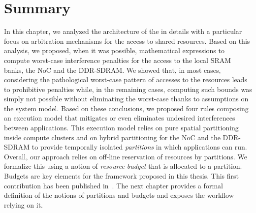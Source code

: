 \documentclass[main.tex]{subfiles}
\begin{document}
\section{Summary}
In this chapter, we analyzed the architecture of the \mppalong in details with
a particular focus on arbitration mechanisms for the access to shared
resources. Based on this analysis, we proposed, when it was possible,
mathematical expressions to compute worst-case interference penalties for the
access to the local SRAM banks, the NoC and the DDR-SDRAM. We showed that, in
most cases, considering the pathological worst-case pattern of accesses to the
resources leads to prohibitive penalties while, in the remaining cases,
computing such bounds was simply not possible without eliminating the
worst-case thanks to assumptions on the system model. Based on these
conclusions, we proposed four rules composing an execution model that mitigates
or even eliminates undesired interferences between applications. This execution
model relies on pure spatial partitioning inside compute clusters and on hybrid
partitioning for the NoC and the DDR-SDRAM to provide temporally isolated
\emph{partitions} in which applications can run. Overall, our approach relies
on off-line reservation of resources by partitions. We formalize this using a
notion of \emph{resource budget} that is allocated to a partition. Budgets are
key elements for the framework proposed in this thesis. This first contribution
has been published in~\cite{Perret16}. The next chapter provides a formal
definition of the notions of partitions and budgets and exposes the workflow
relying on it.



\clearpage
\subbiblio
\end{document}

